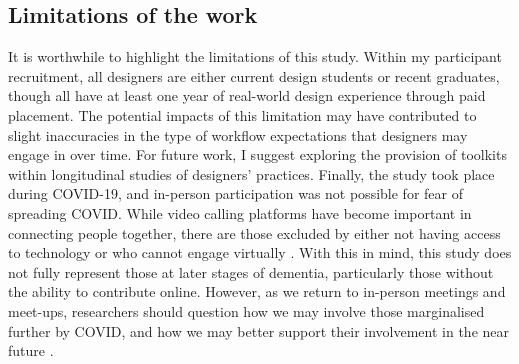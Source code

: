 \subsection{Limitations of the work}
It is worthwhile to highlight the limitations of this study. Within my participant recruitment, all designers are either current design students or recent graduates, though all have at least one year of real-world design experience through paid placement. The potential impacts of this limitation may have contributed to slight inaccuracies in the type of workflow expectations that designers may engage in over time. For future work, I suggest exploring the provision of toolkits within longitudinal studies of designers’ practices. Finally, the study took place during COVID-19, and in-person participation was not possible for fear of spreading COVID. While video calling platforms have become important in connecting people together, there are those excluded by either not having access to technology or who cannot engage virtually \citep{masoud2021we}. With this in mind, this study does not fully represent those at later stages of dementia, particularly those without the ability to contribute online. However, as we return to in-person meetings and meet-ups, researchers should question how we may involve those marginalised further by COVID, and how we may better support their involvement in the near future \citep{braybrooke2021care}.

